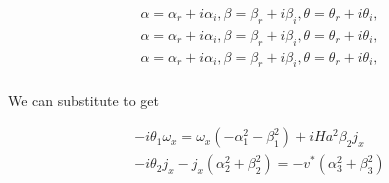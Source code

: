 \documentclass[11pt]{article}
\begin{document}


\begin{equation}\begin{aligned}
\alpha = \alpha_r + i \alpha_i, \beta = \beta_r + i \beta_i, \theta = \theta_r + i \theta_i,  \\
\alpha = \alpha_r + i \alpha_i, \beta = \beta_r + i \beta_i, \theta = \theta_r + i \theta_i,  \\
\alpha = \alpha_r + i \alpha_i, \beta = \beta_r + i \beta_i, \theta = \theta_r + i \theta_i,  \\
\end{aligned}\end{equation}

We can substitute to get

\begin{equation}\begin{aligned}
-i\theta_1 \omega_x = \omega_x (-\alpha_1^2 - \beta_1^2) + i Ha^2 \beta_2 j_x \\
-i\theta_2 j_x - j_x (\alpha_2^2 + \beta_2^2) = - v^* (\alpha_3^2 + \beta_3^2) \\
\end{aligned}\end{equation}
\end{document}
